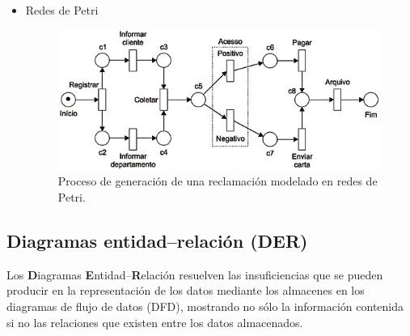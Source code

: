 \begin{enumerate}
\begin{itemize}
        \item Redes de Petri
                \begin{figure}[H]
          \centering
          \includegraphics[width=0.9\linewidth]{Resources/redPetri}
          \caption{Proceso de generación de una reclamación modelado en redes de Petri.}
        \end{figure}
    \end{itemize}
\end{enumerate}





\subsection{Diagramas entidad--relación (DER)} %
Los \textbf{D}iagramas \textbf{E}ntidad--\textbf{R}elación resuelven las insuficiencias que se pueden producir en la representación de los datos mediante los almacenes en los diagramas de flujo de datos (DFD), mostrando no sólo la información contenida si no las relaciones que existen entre los datos almacenados.


